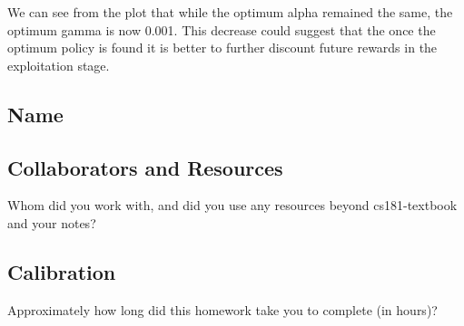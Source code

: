 \documentclass[submit]{harvardml}
\begin{document}
We can see from the plot that while the optimum alpha remained the same, the optimum gamma is now 0.001. This decrease could suggest that the once the optimum policy is found it is better to further discount future rewards in the exploitation stage. 

        


\newpage
\newpage

\subsection*{Name}

\subsection*{Collaborators and Resources}
Whom did you work with, and did you use any resources beyond cs181-textbook and your notes?

\subsection*{Calibration}
Approximately how long did this homework take you to complete (in hours)? 
\end{document}
